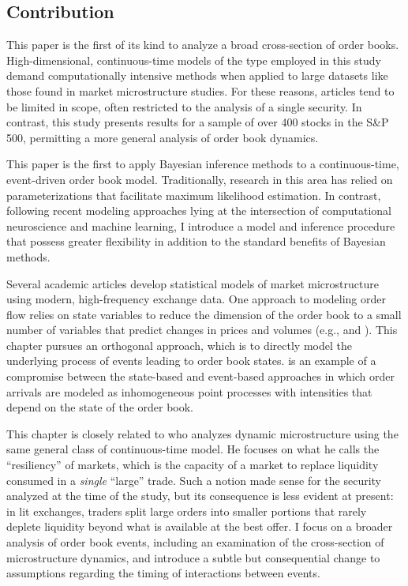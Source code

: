 	\subsection{Contribution}
		This paper is the first of its kind to analyze a broad cross-section of order books. High-dimensional, continuous-time models of the type employed in this study demand computationally intensive methods when applied to large datasets like those found in market microstructure studies. For these reasons, articles tend to be limited in scope, often restricted to the analysis of a single security. In contrast, this study presents results for a sample of over 400 stocks in the S\&P 500, permitting a more general analysis of order book dynamics.

		This paper is the first to apply Bayesian inference methods to a continuous-time, event-driven order book model. Traditionally, research in this area has relied on parameterizations that facilitate maximum likelihood estimation. In contrast, following recent modeling approaches lying at the intersection of computational neuroscience and machine learning, I introduce a model and inference procedure that possess greater flexibility in addition to the standard benefits of Bayesian methods.

		Several academic articles develop statistical models of market microstructure using modern, high-frequency exchange data. One approach to modeling order flow relies on state variables to reduce the dimension of the order book to a small number of variables that predict changes in prices and volumes (e.g., \cite{Avellaneda2011} and \cite{Cont2013B}). This chapter pursues an orthogonal approach, which is to directly model the underlying process of events leading to order book states. \cite{Huang2015} is an example of a compromise between the state-based and event-based approaches in which order arrivals are modeled as inhomogeneous point processes with intensities that depend on the state of the order book.

		This chapter is closely related to \cite{Large2007} who analyzes dynamic microstructure using the same general class of continuous-time model. He focuses on what he calls the ``resiliency'' of markets, which is the capacity of a market to replace liquidity consumed in a \textit{single} ``large'' trade. Such a notion made sense for the security analyzed at the time of the study, but its consequence is less evident at present: in lit exchanges, traders split large orders into smaller portions that rarely deplete liquidity beyond what is available at the best offer. I focus on a broader analysis of order book events, including an examination of the cross-section of microstructure dynamics, and introduce a subtle but consequential change to assumptions regarding the timing of interactions between events.

